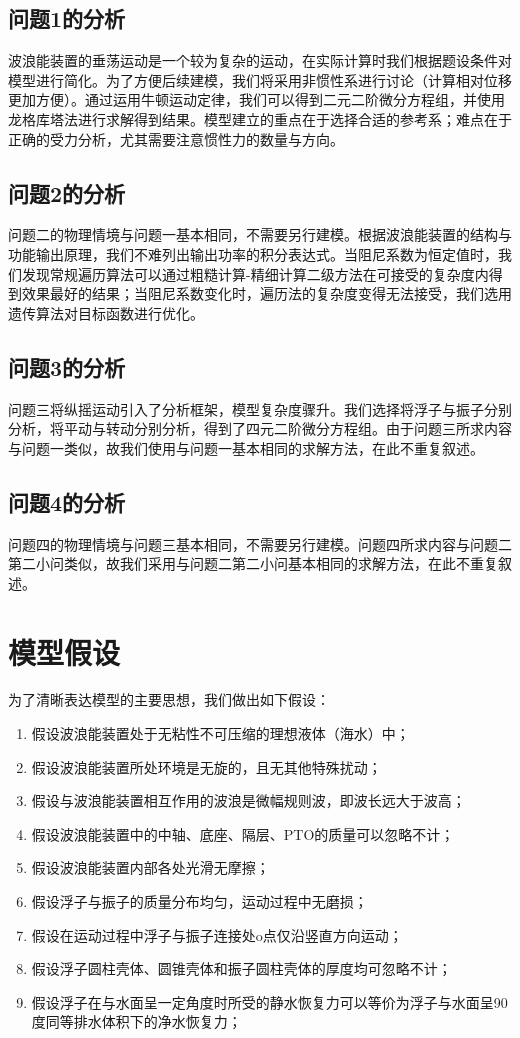 \documentclass[12pt,utf8]{article}
\begin{document}
\subsection{问题1的分析}
波浪能装置的垂荡运动是一个较为复杂的运动，在实际计算时我们根据题设条件对模型进行简化。为了方便后续建模，我们将采用非惯性系进行讨论（计算相对位移更加方便）。通过运用牛顿运动定律，我们可以得到二元二阶微分方程组，并使用龙格库塔法进行求解得到结果。模型建立的重点在于选择合适的参考系；难点在于正确的受力分析，尤其需要注意惯性力的数量与方向。

\subsection{问题2的分析}
问题二的物理情境与问题一基本相同，不需要另行建模。根据波浪能装置的结构与功能输出原理，我们不难列出输出功率的积分表达式。当阻尼系数为恒定值时，我们发现常规遍历算法可以通过粗糙计算-精细计算二级方法在可接受的复杂度内得到效果最好的结果；当阻尼系数变化时，遍历法的复杂度变得无法接受，我们选用遗传算法对目标函数进行优化。

\subsection{问题3的分析}
问题三将纵摇运动引入了分析框架，模型复杂度骤升。我们选择将浮子与振子分别分析，将平动与转动分别分析，得到了四元二阶微分方程组。由于问题三所求内容与问题一类似，故我们使用与问题一基本相同的求解方法，在此不重复叙述。

\subsection{问题4的分析}
问题四的物理情境与问题三基本相同，不需要另行建模。问题四所求内容与问题二第二小问类似，故我们采用与问题二第二小问基本相同的求解方法，在此不重复叙述。



\section{模型假设}

为了清晰表达模型的主要思想，我们做出如下假设：
\begin{enumerate}
	\item 假设波浪能装置处于无粘性不可压缩的理想液体（海水）中；
	\item 假设波浪能装置所处环境是无旋的，且无其他特殊扰动；
	\item 假设与波浪能装置相互作用的波浪是微幅规则波，即波长远大于波高；
	\item 假设波浪能装置中的中轴、底座、隔层、PTO的质量可以忽略不计；
	\item 假设波浪能装置内部各处光滑无摩擦；
	\item 假设浮子与振子的质量分布均匀，运动过程中无磨损；
	\item 假设在运动过程中浮子与振子连接处o点仅沿竖直方向运动；
	\item 假设浮子圆柱壳体、圆锥壳体和振子圆柱壳体的厚度均可忽略不计；
	\item 假设浮子在与水面呈一定角度时所受的静水恢复力可以等价为浮子与水面呈90度同等排水体积下的净水恢复力；
	
\end{enumerate}
\end{document}
